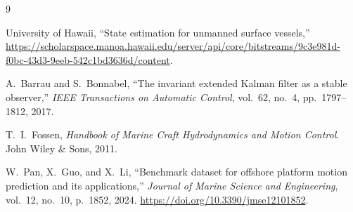 \documentclass[conference]{IEEEtran}
\begin{document}

\begin{thebibliography}{9}

University of Hawaii, ``State estimation for unmanned surface vessels,''
\url{https://scholarspace.manoa.hawaii.edu/server/api/core/bitstreams/9c3e981d-f0bc-43d3-9eeb-542c1bd3636d/content}.

A.~Barrau and S.~Bonnabel, ``The invariant extended Kalman filter as a stable observer,''
\textit{IEEE Transactions on Automatic Control}, vol.~62, no.~4, pp.~1797--1812, 2017.

T.~I.~Fossen, \textit{Handbook of Marine Craft Hydrodynamics and Motion Control}.
John Wiley \& Sons, 2011.

W.~Pan, X.~Guo, and X.~Li, ``Benchmark dataset for offshore platform motion prediction and its applications,''
\textit{Journal of Marine Science and Engineering}, vol.~12, no.~10, p.~1852, 2024.
\url{https://doi.org/10.3390/jmse12101852}.


\end{thebibliography}
\end{document}
